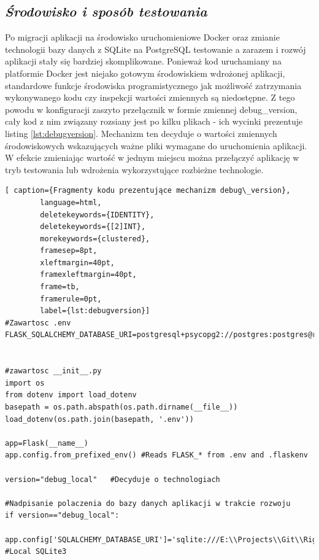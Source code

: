 \documentclass[a4paper, 10pt, twoside, openright]{report}
\newcommand{\customstylesection}[1]{\textbf{\textit{#1}}}
\begin{document}
\begin{large}
\section{\customstylesection{Środowisko i sposób testowania}}
{Po migracji aplikacji na środowisko uruchomieniowe Docker oraz zmianie 
technologii bazy danych z SQLite na PostgreSQL testowanie a zarazem i rozwój 
aplikacji stały się bardziej skomplikowane. Ponieważ kod uruchamiany na 
platformie Docker jest niejako gotowym środowiskiem wdrożonej aplikacji, 
standardowe funkcje środowiska programistycznego jak możliwość zatrzymania 
wykonywanego kodu czy inspekcji wartości zmiennych są niedostępne. Z tego powodu
 w konfiguracji zaszyto przełącznik w formie zmiennej debug\_version, cały kod 
z nim związany rozsiany jest po kilku plikach - ich wycinki prezentuje listing 
\ref{lst:debugversion}. Mechanizm ten decyduje o wartości zmiennych 
środowiskowych wskazujących ważne pliki wymagane do uruchomienia aplikacji. W 
efekcie zmieniając wartość w jednym miejscu można przełączyć aplikację w tryb 
testowania lub wdrożenia wykorzystujące rozbieżne technologie.}

\begin{minipage}{\textwidth}
    \begin{lstlisting}[ caption={Fragmenty kodu prezentujące mechanizm debug\_version},
        language=html,
        deletekeywords={IDENTITY},
        deletekeywords={[2]INT},
        morekeywords={clustered},
        framesep=8pt,
        xleftmargin=40pt,
        framexleftmargin=40pt,
        frame=tb,
        framerule=0pt,
        label={lst:debugversion}]
#Zawartosc .env
FLASK_SQLALCHEMY_DATABASE_URI=postgresql+psycopg2://postgres:postgres@rightendb:5432/RightenDB


#zawartosc __init__.py
import os
from dotenv import load_dotenv
basepath = os.path.abspath(os.path.dirname(__file__))
load_dotenv(os.path.join(basepath, '.env'))

app=Flask(__name__)
app.config.from_prefixed_env() #Reads FLASK_* from .env and .flaskenv

version="debug_local"   #Decyduje o technologiach

#Nadpisanie polaczenia do bazy danych aplikacji w trakcie rozwoju 
if version=="debug_local":
    app.config['SQLALCHEMY_DATABASE_URI']='sqlite:///E:\\Projects\\Git\\Righten\\Sources\\Database\\Righten_mock.sqlite3' #Local SQLite3


\end{lstlisting}
\end{minipage}
\end{large}
\end{document}
